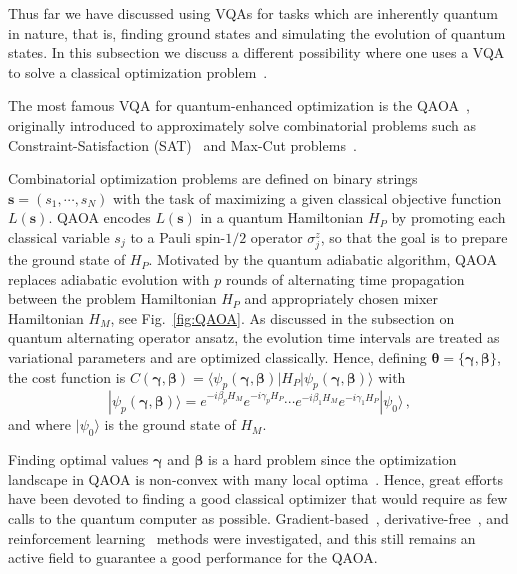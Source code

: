 \documentclass[prx,twocolumn,floatfix,superscriptaddress,longbibliography]{revtex4-1}
\renewcommand{\vec}[1]{\boldsymbol{#1}}  %
\newcommand{\<}{\langle}
\renewcommand{\>}{\rangle}
\newcommand{\ket}[1]{|#1\rangle}               %
\newcommand{\bra}[1]{\langle #1|}              %
\renewcommand{\vec}[1]{\boldsymbol{#1}}  %
\begin{document}
Thus far we have discussed using VQAs for tasks which are inherently quantum in nature, that is, finding ground states and simulating the evolution of quantum states. In this subsection we discuss a different possibility where one uses a VQA to solve a classical optimization problem~\cite{moll2018quantum}. 

The most famous VQA for quantum-enhanced optimization is the QAOA~\cite{qaoa2014}, originally introduced to approximately solve combinatorial problems such as Constraint-Satisfaction (SAT)~\cite{Lin2016sat} and Max-Cut problems~\cite{qaoaMaxCut2018}.


Combinatorial optimization problems are defined on binary strings $\vec{s}=(s_1,\cdots,s_N)$ with the task of maximizing a given classical objective function $L(\vec{s})$. QAOA encodes $L(\vec{s})$ in a quantum Hamiltonian $H_P$ by promoting each classical variable $s_j$ to a Pauli spin-$1/2$ operator $\sigma^z_j$, so that the goal is to prepare the ground state of $H_P$. Motivated by the quantum adiabatic algorithm, QAOA replaces adiabatic evolution with $p$ rounds of alternating time propagation between the problem Hamiltonian $H_P$ and appropriately chosen mixer Hamiltonian $H_M$, see Fig.~\ref{fig:QAOA}. As discussed in the subsection on quantum alternating operator ansatz, the evolution time intervals are treated as variational parameters and are optimized classically. Hence, defining $\vec{\theta}=\{\vec{\gamma},\vec{\beta}\}$, the cost function is $C(\vec{\gamma},\vec{\beta})=\bra{\psi_p(\vec{\gamma},\vec{\beta})} H_P \ket{\psi_p(\vec{\gamma},\vec{\beta})}$ with
\small
\begin{equation} \label{eq:QAOAansatz}
\ket{\psi_p(\vec{\gamma},\vec{\beta})} = 
e^{-i \beta_p H_M} e^{-i \gamma_p H_P} \cdots
e^{-i \beta_1 H_M} e^{-i \gamma_1 H_P} \ket{\psi_0} \,,
\end{equation}
\normalsize
and where $\ket{\psi_0}$ is the ground state of $H_M$.

Finding optimal values $\vec{\gamma}$ and $\vec{\beta}$ is a hard problem since the optimization landscape in QAOA is non-convex with many local optima~\cite{shaydulin2019multistart}. Hence, great efforts have been devoted to finding a good classical optimizer that would require as few calls to the quantum computer as possible. Gradient-based~\cite{romero2018strategies, crooks2018performance}, derivative-free~\cite{wecker2016training, Yang2017optimizing}, and reinforcement learning~\cite{khairy2020learning} methods were investigated, and this still remains an active field to guarantee a good performance for the QAOA. 
\end{document}
